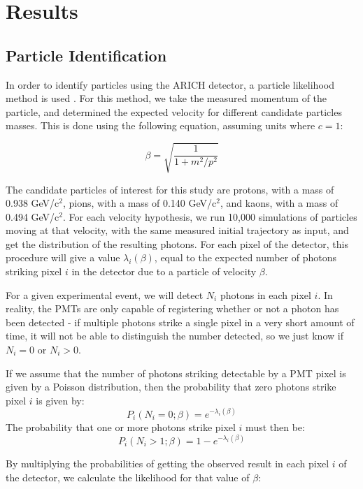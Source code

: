 
\chapter{Results}
\label{ch:Results}
\section{Particle Identification}
\label{sec:particleIdentification}
In order to identify particles using the \ac{ARICH} detector, a particle likelihood method is used \cite{richImpact, belleArich}.
For this method, we take the measured momentum of the particle, and determined the expected velocity for different candidate particles masses. This is done using the following equation, assuming units where $c = 1$:

\begin{equation}
\label{eq:relMass}
 \beta = \sqrt{\frac{1}{1 +m^2 / p^2}}
\end{equation}

The candidate particles of interest for this study are protons, with a mass of 0.938 GeV/c$^2$, pions, with a mass of 0.140 GeV/c$^2$, and kaons, with a mass of 0.494 GeV/c$^2$. 
For each velocity hypothesis, we run 10,000 simulations of particles moving at that velocity, with the same measured initial trajectory as input, and get the distribution of the resulting photons.
For each pixel of the detector, this procedure will give a value $\lambda_i(\beta)$, equal to the expected number of photons striking pixel $i$ in the detector due to a particle of velocity $\beta$. 

For a given experimental event, we will detect $N_i$ photons in each pixel $i$.
In reality, the PMTs are only capable of registering whether or not a photon has been detected - if multiple photons strike a single pixel in a very short amount of time, it will not be able to distinguish the number detected, so we just know if $N_i = 0$ or $N_i > 0$.

If we assume that the number of photons striking detectable by a PMT pixel is given by a Poisson distribution, then the probability that zero photons strike pixel $i$ is given by:
$$ P_i(N_i=0; \beta) = e^{-\lambda_i(\beta)} $$
 The probability that one or more photons strike pixel $i$ must then be:
$$ P_i(N_i>1; \beta) = 1 - e^{-\lambda_i(\beta)} $$

By multiplying the probabilities of getting the observed result in each pixel $i$ of the detector, we calculate the likelihood for that value of $\beta$:

